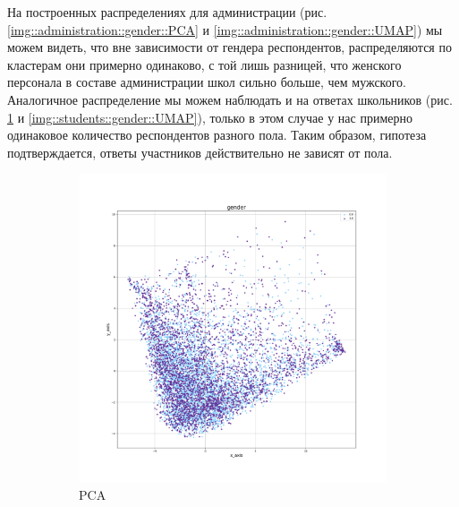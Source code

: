 На построенных распределениях для администрации (рис. \ref{img::administration::gender::PCA} и \ref{img::administration::gender::UMAP}) мы можем видеть, что вне зависимости от гендера респондентов, распределяются по кластерам они примерно одинаково, с той лишь разницей, что женского персонала в составе администрации школ сильно больше, чем мужского.
Аналогичное распределение мы можем наблюдать и на ответах школьников (рис. \ref{img::students::gender::PCA} и \ref{img::students::gender::UMAP}), только в этом случае у нас примерно одинаковое количество респондентов разного пола.
Таким образом, гипотеза подтверждается, ответы участников действительно не зависят от пола.

\begin{figure}[h!]
    \centering
    
    \begin{subfigure}{.5\textwidth}
      \centering
      \includegraphics[width=\linewidth]{../img/students_PCA_gender.png}
      \caption{PCA}
      \label{img::students::gender::PCA}
    \end{subfigure}%
    \begin{subfigure}{.5\textwidth}
      \centering

\end{subfigure}
\end{figure}
